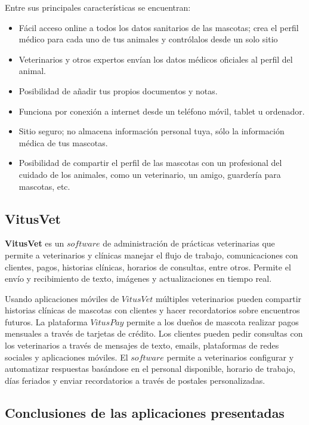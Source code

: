 Entre sus principales características se encuentran:
\begin{itemize}


\item	Fácil acceso online a todos los datos sanitarios de las mascotas; crea el perfil médico para cada uno de tus animales y contrólalos desde un solo sitio
\item	Veterinarios y otros expertos envían los datos médicos oficiales al perfil del animal.
\item	Posibilidad de añadir tus propios documentos y notas.
\item	Funciona por conexión a internet desde un teléfono móvil, tablet u ordenador.
\item	Sitio seguro; no almacena información personal tuya, sólo la información médica de tus mascotas.
\item	Posibilidad de compartir el perfil de las mascotas con un profesional del cuidado de los animales, como un veterinario, un amigo, guardería para mascotas, etc.
\end{itemize}


\subsection{VitusVet}\label{chapter:introduction}

\textbf{VitusVet}  es un $software$ de administración de prácticas veterinarias que permite a veterinarios y clínicas manejar el flujo de trabajo, comunicaciones con clientes, pagos, historias clínicas, horarios de consultas, entre otros. Permite el envío y recibimiento de texto, imágenes y actualizaciones en tiempo real.

Usando aplicaciones móviles de $VitusVet$ múltiples veterinarios pueden compartir historias clínicas de mascotas con clientes y hacer recordatorios sobre encuentros futuros. La plataforma $VitusPay$ permite a los dueños de mascota realizar pagos mensuales a través de tarjetas de crédito. Los clientes pueden pedir consultas con los veterinarios a través de mensajes de texto, emails, plataformas de redes sociales y aplicaciones móviles. El $software$ permite a veterinarios configurar y automatizar respuestas basándose en el personal disponible, horario de trabajo, días feriados y enviar recordatorios a través de postales personalizadas. 





\subsection{Conclusiones de las aplicaciones presentadas}\label{chapter:introduction}

